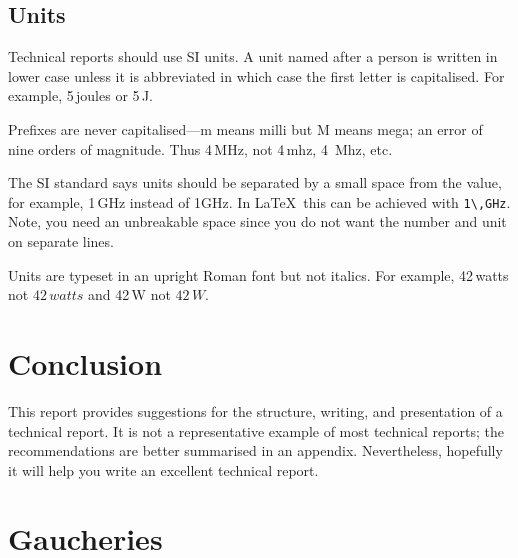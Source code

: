 \documentclass[a4paper,12pt]{article}
\newcounter{foo}
\begin{document}
\subsection{Units}
\label{sec:units}

\begin{list}{U-}{}
\item Technical reports should use SI units.  A unit named after a person is
written in lower case unless it is abbreviated in which case the first
letter is capitalised.    For example, 5\,joules or 5\,J.

\item Prefixes are never capitalised---m means milli but M means mega;
  an error of nine orders of magnitude.  Thus 4\,MHz, not 4\,mhz,
  4~Mhz, etc.

\item The SI standard says units should be separated by a small space
  from the value, for example, 1\,GHz instead of 1GHz.  In
  \LaTeX\ this can be achieved with \verb+1\,GHz+.  Note, you need an
  unbreakable space since you do not want the number and unit on
  separate lines.

\item Units are typeset in an upright Roman font but not italics.  For
  example, 42\,watts not $42\,watts$ and 42\,W not $42\,W$.

\end{list}


\section{Conclusion}
\label{sec:conclusion}

This report provides suggestions for the structure, writing, and
presentation of a technical report.  It is not a representative
example of most technical reports; the recommendations are better
summarised in an appendix.  Nevertheless, hopefully it will help you
write an excellent technical report.






\appendix

\section{Gaucheries}
\label{sec:gaucheries}

\newcommand{\gauchery}[2]{#1 $\rightarrow$ #2 \\}
\end{document}
